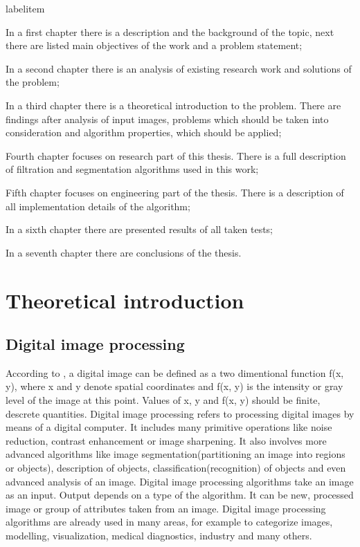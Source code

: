 \documentclass[a4paper,onecolumn,oneside,12pt]{memoir}
\makeatletter
\renewenvironment{itemize}{
  \begin{list}{  
  \csname labelitem\romannumeral\the\@listdepth\endcsname}{
  \setlength{\leftmargin}{1em}
	\setlength{\topsep}{6pt}%
	\setlength{\partopsep}{0pt}%
	\setlength{\parskip}{0pt}%
	\setlength{\parsep}{0pt}%
	\setlength{\itemsep}{0pt}}
}{
  \end{list}
}
\makeatother
\begin{document}
\begin{itemize}
  \item In a first chapter there is a description and the background of the topic, 
        next there are listed main objectives of the work and a problem statement;
  \item In a second chapter there is an analysis of existing research work and solutions
        of the problem;
  \item In a third chapter there is a theoretical introduction to the problem. There are 
        findings after analysis of input images, problems which should be taken into consideration
        and algorithm properties, which should be applied;
  \item Fourth chapter focuses on research part of this thesis. There is a full description of
        filtration and segmentation algorithms used in this work;
  \item Fifth chapter focuses on engineering part of the thesis. There is a description of 
        all implementation details of the algorithm;
  \item In a sixth chapter there are presented results of all taken tests;
  \item In a seventh chapter there are conclusions of the thesis.
\end{itemize}

\chapter{Theoretical introduction}



\section{Digital image processing}

According to \cite{digitalImageProcessing},
a digital image can be defined as a two dimentional function f(x, y), where x and y denote spatial 
coordinates and f(x, y) is the intensity or gray level of the image at this point. Values of x, y
and f(x, y) should be finite, descrete quantities. Digital image processing refers to processing 
digital images by means of a digital computer. It includes many primitive operations like noise
reduction, contrast enhancement or image sharpening. It also involves more advanced algorithms like
image segmentation(partitioning an image into regions or objects), description of objects,
classification(recognition) of objects and even advanced analysis of an image. Digital image 
processing algorithms take an image as an input. Output depends on a type of the algorithm.
It can be new, processed image or group of attributes taken from an image. Digital image processing
algorithms are already used in many areas, for example to categorize images, modelling, visualization,
medical diagnostics, industry and many others.
\end{document}
